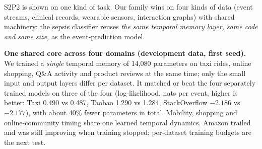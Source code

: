 \documentclass[10pt, a4 paper]{article}
\newcommand{\sect}[2]{\vspace{2pt}{\color{ours}\footnotesize\bfseries\MakeUppercase{#1}}\par\vspace{-3pt}{\LARGE\bfseries #2}\par\vspace{2pt}}
\begin{document}
\newpage
\sect{Generality}{One family across different kinds of data}

S2P2 is shown on one kind of task. Our family wins on four kinds of data (event streams, clinical records, wearable sensors, interaction graphs) with shared machinery: the sepsis classifier reuses \emph{the same temporal memory layer, same code and same size,} as the event-prediction model.

\begin{center}
\end{center}

\begin{tile}
\textbf{One shared core across four domains (development data, first seed).} We trained a \emph{single} temporal memory of 14,080 parameters on taxi rides, online shopping, Q\&A activity and product reviews at the same time; only the small input and output layers differ per dataset. It matched or beat the four separately trained models on three of the four (log-likelihood, nats per event, higher is better: Taxi 0.490 vs 0.487, Taobao 1.290 vs 1.284, StackOverflow $-2.186$ vs $-2.177$), with about 40\% fewer parameters in total. Mobility, shopping and online-community timing share one learned temporal dynamics. Amazon trailed and was still improving when training stopped; per-dataset training budgets are the next test.
\end{tile}
\end{document}

